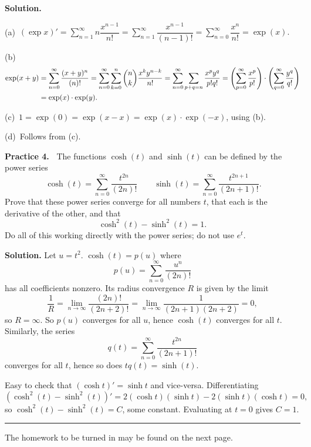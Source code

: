 \documentclass[12pt]{article}
\theoremstyle{definition}
\theoremstyle{remark}
\theoremstyle{definition}
\newenvironment{Solution}{\noindent\textbf{Solution.}}{}
\begin{document}
\begin{Solution}

(a)\ $(\exp x)'=\sum\limits_{n=1}^\infty n\dfrac{x^{n-1}}{n!}=
\sum\limits_{n=1}^\infty \dfrac{x^{n-1}}{(n-1)!}=
\sum\limits_{n=0}^\infty \dfrac{x^{n}}{n!}=\exp(x).$

(b)\ 
\[\begin{split}\exp(x+y)&=\sum\limits_{n=0}^\infty \dfrac{(x+y)^{n}}{(n)!}=
\sum\limits_{n=0}^\infty \sum\limits_{k=0}^n\dbinom{n}{k}\dfrac{x^ky^{n-k}}{n!}
=\sum\limits_{n=0}^\infty \sum\limits_{p+q=n}\dfrac{x^py^{q}}{p!q!}
=\left(\sum\limits_{p=0}^\infty\dfrac{x^p}{p!}\right)\cdot
\left(\sum\limits_{q=0}^\infty\dfrac{y^q}{q!}\right)\\
&=\exp(x)\cdot\exp(y).
\end{split}
\]

(c)\ $1=\exp(0)=\exp(x-x)=\exp(x)\cdot \exp(-x)$, using (b). 

(d)\ Follows from (c). 



\end{Solution}


{\bf Practice 4.\ }  The functions $\cosh(t)$ and $\sinh (t)$ can be defined by the power series
\[\
\cosh(t)= \sum_{n=0}^\infty \frac{t^{2n}}{(2n)!}\qquad
\sinh(t)= \sum_{n=0}^\infty \frac{t^{2n+1}}{(2n+1)!}.
\]
Prove that these power series converge for all numbers $t$,  that each is the derivative of the other, and that 
\[\cosh^2(t)-\sinh^2(t)=1.\]
Do all of this working directly with the power series; do not use $e^t$. 


\begin{Solution} Let $u=t^2$. $\cosh(t)=p(u)$ where 
\[p(u)=\sum_{n=0}^\infty \frac{u^n}{(2n)!}\]
has all coefficients nonzero. Its radius convergence $R$ is given by the limit
\[\frac{1}{R}=\lim_{n\to\infty}\frac{(2n)!}{(2n+2)!}=\lim_{n\to\infty}\frac{1}{(2n+1)(2n+2)}=0,\]
so $R=\infty$. So $p(u)$ converges for all $u$, hence $\cosh(t)$ converges for all $t$. 
Similarly, the series 
\[q(t)=\sum_{n=0}^\infty \frac{t^{2n}}{(2n+1)!}\]
converges for all $t$, hence so does $tq(t)=\sinh(t)$. 

Easy to check that $(\cosh t)'=\sinh t$ and vice-versa. Differentiating 
\[(\cosh^2(t)-\sinh^2(t))'=2(\cosh t)(\sinh t)-2(\sinh t)(\cosh t)=0,\]
so $\cosh^2(t)-\sinh^2(t)=C$, some constant. Evaluating at $t=0$ gives $C=1$. 
\end{Solution}

 \rule{\textwidth}{1pt}
The homework to be turned in may be found on the next page.
\end{document}
